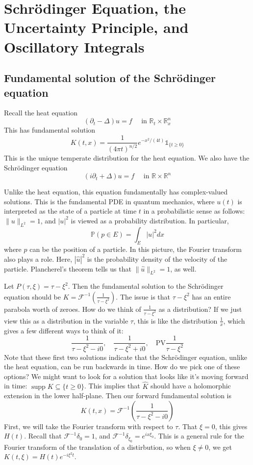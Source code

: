 \newpage
\section{Schr\"odinger Equation, the Uncertainty Principle, and Oscillatory Integrals}

\subsection{Fundamental solution of the Schr\"odinger equation}
Recall the heat equation
$$
\left(\partial_{t}-\Delta\right) u=f \quad \text { in } \mathbb{R}_{t} \times \mathbb{R}_{x}^{n}
$$
This has fundamental solution
$$
K(t, x)=\frac{1}{(4 \pi t)^{n / 2}} e^{-x^{2} /(4 t)} \mathbb{1}_{\{t \geq 0\}}
$$
This is the unique temperate distribution for the heat equation.
We also have the Schrödinger equation
$$
\left(i \partial_{t}+\Delta\right) u=f \quad \text { in } \mathbb{R} \times \mathbb{R}^{n}
$$

Unlike the heat equation, this equation fundamentally has complex-valued solutions. This is the fundamental PDE in quantum mechanics, where $u(t)$ is interpreted as the state of a particle at time $t$ in a probabilistic sense as follows: $\|u\|_{L^{2}}=1$, and $|u|^{2}$ is viewed as a probability distribution. In particular,
$$
\mathbb{P}(p \in E)=\int_{E}|u|^{2} d x
$$
where $p$ can be the position of a particle. In this picture, the Fourier transform also plays a role. Here, $|\widehat{u}|^{2}$ is the probability density of the velocity of the particle. Plancherel's theorem tells us that $\|\widehat{u}\|_{L^{2}}=1$, as well.

Let $P(\tau, \xi)=\tau-\xi^{2}$. Then the fundamental solution to the Schrödinger equation should be $K=\mathcal{F}^{-1}\left(\frac{1}{\tau-\xi^{2}}\right) .$ The issue is that $\tau-\xi^{2}$ has an entire parabola worth of zeroes. How do we think of $\frac{1}{\tau-\xi^{2}}$ as a distribution? If we just view this as a distribution in the variable $\tau$, this is like the distribution $\frac{1}{x}$, which gives a few different ways to think of it:
$$
\frac{1}{\tau-\xi^2-i 0}, \quad \frac{1}{\tau-\xi^{2}+i 0}, \quad \mathrm{PV} \frac{1}{\tau-\xi^{2}}
$$
Note that these first two solutions indicate that the Schrödinger equation, unlike the heat equation, can be run backwards in time. How do we pick one of these options? We might want to look for a solution that looks like it's moving forward in time: $\operatorname{supp} K \subseteq\{t \geq 0\}$. This implies that $\widehat{K}$ should have a holomorphic extension in the lower half-plane. Then our forward fundamental solution is 
$$
K(t, x)=\mathcal{F}^{-1}\left(\frac{1}{\tau-\xi^{2}-i 0}\right)
$$
First, we will take the Fourier transform with respect to $\tau$. That $\xi=0$, this gives $H(t)$. Recall that $\mathcal{F}^{-1} \delta_{0}=1$, and $\mathcal{F}^{-1} \delta_{\xi_{0}}=e^{i x \xi_{0}}$. This is a general rule for the Fourier transform of the translation of a distirbution, so when $\xi \neq 0$, we get $K(t, \xi)=H(t) e^{-i \xi^{2} t}$.

